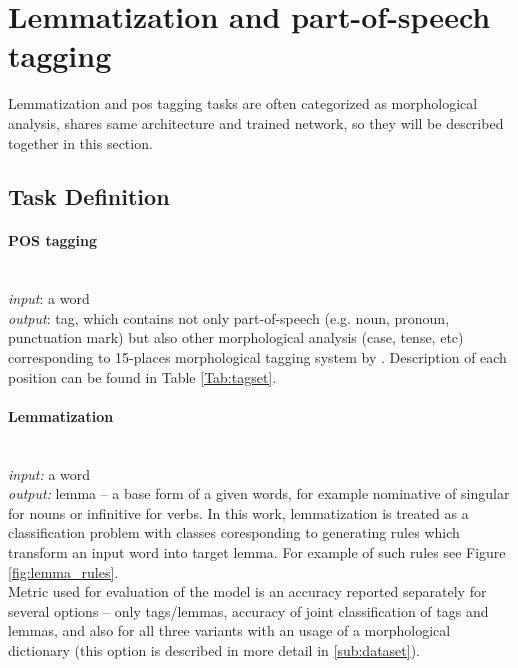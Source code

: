\section{Lemmatization and part-of-speech tagging}
\label{chap:tag}
Lemmatization and \acrlong{pos} tagging tasks are often categorized as morphological analysis, shares same architecture and trained network, so they will be described together in this section.
\subsection{Task Definition}

\paragraph{\textbf{POS tagging}} \mbox{}\\
\textit{input}: a word \\
\textit{output}: tag, which contains not only part-of-speech (e.g. noun, pronoun, punctuation mark) but also other morphological analysis (case, tense, etc) corresponding to 15-places morphological tagging system by \cite{Hajic2004}. Description of each position can be found in Table \ref{Tab:tagset}.

\paragraph{\textbf{Lemmatization}} \mbox{}\\
\textit{input:} a word \\
\textit{output:} lemma -- a base form of a given words, for example nominative of singular for nouns or infinitive for verbs. In this work, lemmatization is treated as a classification problem with classes coresponding to generating rules which transform an input word into target lemma. For example of such rules see Figure \ref{fig:lemma_rules}. \\ %




Metric used for evaluation of the model is an accuracy reported separately for several options -- only tags/lemmas, accuracy of joint classification of tags and lemmas, and  also for all three variants with an usage of a morphological dictionary (this option is described in more detail in \ref{sub:dataset}).

